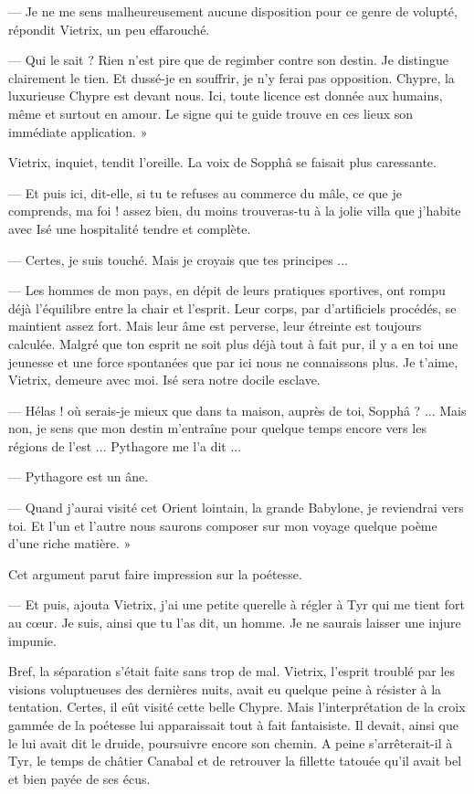 \documentclass[a4paper, 11pt, oneside, polutonikogreek, french]{article}
\begin{document}
--- Je ne me sens malheureusement aucune disposition pour ce genre de volupté, répondit Vietrix, un peu effarouché.

--- Qui le sait ? Rien n'est pire que de regimber contre son destin. Je distingue clairement le tien. Et dussé-je en souffrir, je n'y ferai pas opposition. Chypre, la luxurieuse Chypre est devant nous. Ici, toute licence est donnée aux humains, même et surtout en amour. Le signe qui te guide trouve en ces lieux son immédiate application. »

Vietrix, inquiet, tendit l'oreille. La voix de Sopphâ se faisait plus caressante.

--- Et puis ici, dit-elle, si tu te refuses au commerce du mâle, ce que je comprends, ma foi ! assez bien, du moins trouveras-tu à la jolie villa que j'habite avec Isé une hospitalité tendre et complète.

--- Certes, je suis touché. Mais je croyais que tes principes ...

--- Les hommes de mon pays, en dépit de leurs pratiques sportives, ont rompu déjà l'équilibre entre la chair et l'esprit. Leur corps, par d'artificiels procédés, se maintient assez fort. Mais leur âme est perverse, leur étreinte est toujours calculée. Malgré que ton esprit ne soit plus déjà tout à fait pur, il y a en toi une jeunesse et une force spontanées que par ici nous ne connaissons plus. Je t'aime, Vietrix, demeure avec moi. Isé sera notre docile esclave.

--- Hélas ! où serais-je mieux que dans ta maison, auprès de toi, Sopphâ ? ... Mais non, je sens que mon destin m'entraîne pour quelque temps encore vers les régions de l'est ... Pythagore me l'a dit ...

--- Pythagore est un âne.

--- Quand j'aurai visité cet Orient lointain, la grande Babylone, je reviendrai vers toi. Et l'un et l'autre nous saurons composer sur mon voyage quelque poème d'une riche matière. »

Cet argument parut faire impression sur la poétesse.

--- Et puis, ajouta Vietrix, j'ai une petite querelle à régler à Tyr qui me tient fort au cœur. Je suis, ainsi que tu l'as dit, un homme. Je ne saurais laisser une injure impunie.

\bigskip
\centerline{\EightStarTaper}
\centerline{\EightStarTaper\EightStarTaper}
\bigskip

Bref, la séparation s'était faite sans trop de mal. Vietrix, l'esprit troublé par les visions voluptueuses des dernières nuits, avait eu quelque peine à résister à la tentation. Certes, il eût visité cette belle Chypre. Mais l'interprétation de la croix gammée de la poétesse lui apparaissait tout à fait fantaisiste. Il devait, ainsi que le lui avait dit le druide, poursuivre encore son chemin. A peine s'arrêterait-il à Tyr, le temps de châtier Canabal et de retrouver la fillette tatouée qu'il avait bel et bien payée de ses écus.
\end{document}
